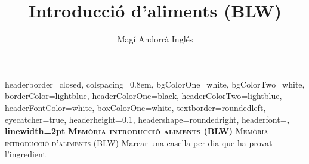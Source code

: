 \documentclass[landscape,a0paper,fontscale=0.285]{baposter} %
\title{Introducció d'aliments (BLW)}
\author{Magí Andorrà Inglés}
\begin{document}
\begin{poster}
{
headerborder=closed, %
colspacing=0.8em, %
bgColorOne=white, %
bgColorTwo=white, %
borderColor=lightblue, %
headerColorOne=black, %
headerColorTwo=lightblue, %
headerFontColor=white, %
boxColorOne=white, %
textborder=roundedleft, %
eyecatcher=true, %
headerheight=0.1\textheight, %
headershape=roundedright, %
headerfont=\Large\bf\textsc, %
linewidth=2pt %
}
{\bf\textsc{Memòria introducció aliments (BLW)}\vspace{0.5em}}
{\textsc{Memòria introducció d'aliments (BLW) \hspace{12pt}}}
{Marcar una casella per dia que ha provat l'ingredient}


\end{poster}
\end{document}

